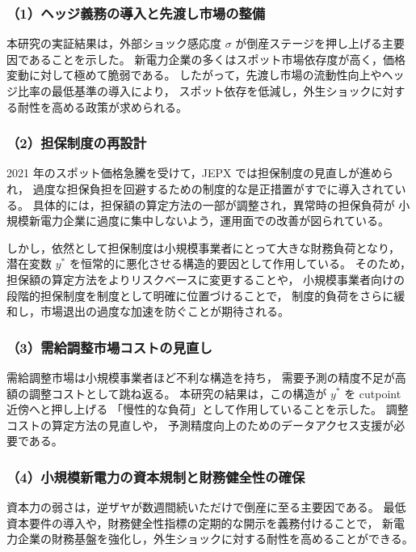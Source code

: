 \subsubsection*{（1）ヘッジ義務の導入と先渡し市場の整備}

本研究の実証結果は，外部ショック感応度 $\sigma$ が倒産ステージを押し上げる主要因であることを示した。
新電力企業の多くはスポット市場依存度が高く，価格変動に対して極めて脆弱である。
したがって，先渡し市場の流動性向上やヘッジ比率の最低基準の導入により，
スポット依存を低減し，外生ショックに対する耐性を高める政策が求められる。

\subsubsection*{（2）担保制度の再設計}

2021 年のスポット価格急騰を受けて，JEPX では担保制度の見直しが進められ，
過度な担保負担を回避するための制度的な是正措置がすでに導入されている。
具体的には，担保額の算定方法の一部が調整され，異常時の担保負荷が
小規模新電力企業に過度に集中しないよう，運用面での改善が図られている。

しかし，依然として担保制度は小規模事業者にとって大きな財務負荷となり，
潜在変数 $y^*$ を恒常的に悪化させる構造的要因として作用している。
そのため，担保額の算定方法をよりリスクベースに変更することや，
小規模事業者向けの段階的担保制度を制度として明確に位置づけることで，
制度的負荷をさらに緩和し，市場退出の過度な加速を防ぐことが期待される。

\subsubsection*{（3）需給調整市場コストの見直し}

需給調整市場は小規模事業者ほど不利な構造を持ち，
需要予測の精度不足が高額の調整コストとして跳ね返る。
本研究の結果は，この構造が $y^*$ を cutpoint 近傍へと押し上げる
「慢性的な負荷」として作用していることを示した。
調整コストの算定方法の見直しや，
予測精度向上のためのデータアクセス支援が必要である。

\subsubsection*{（4）小規模新電力の資本規制と財務健全性の確保}

資本力の弱さは，逆ザヤが数週間続いただけで倒産に至る主要因である。
最低資本要件の導入や，財務健全性指標の定期的な開示を義務付けることで，
新電力企業の財務基盤を強化し，外生ショックに対する耐性を高めることができる。

